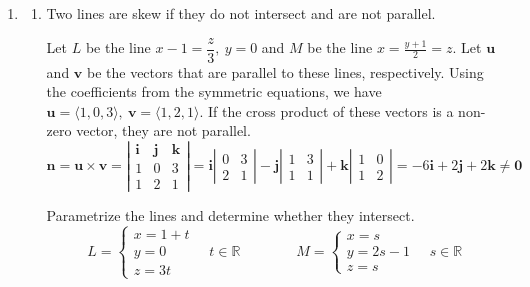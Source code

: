 \documentclass[a4paper, 12pt]{article}
\begin{document}
\newpage
{}
{}



\begin{enumerate}[leftmargin=*,label=\textbf{\arabic*.}]
\item
\begin{enumerate}[leftmargin=*,label=\textbf{\alph*.}]
\item \label{item:19_20_spring_midterm_1} Two lines are skew if they do not intersect and are not parallel.

Let $L$ be the line $x-1=\dfrac z3,\: y=0$  and $M$ be the line $\displaystyle x=\frac{y+1}2=z$. Let $\mathbf u$ and $\mathbf v$ be the vectors that are parallel to these lines, respectively. Using the coefficients from the symmetric equations, we have $\mathbf u=\langle1,0,3\rangle, \:\mathbf v= \langle1,2,1\rangle$. If the cross product of these vectors is a non-zero vector, they are not parallel.
\[\mathbf{n}=\mathbf{u}\times\mathbf{v}=\left|\begin{array}{ccc}
\mathbf{i}&\mathbf{j}&\mathbf{k}\\
1&0&3\\
1&2&1
\end{array}\right|=\mathbf{i}\left|\begin{array}{cc}
0&3\\2&1
\end{array}\right|-\mathbf{j}\left|\begin{array}{cc}
1&3\\1&1
\end{array}\right|+\mathbf{k}\left|\begin{array}{cc}
1&0\\1&2
\end{array}\right|=-6\mathbf{i}+2\mathbf{j}+2\mathbf{k}\neq\mathbf{0}\]

Parametrize the lines and determine whether they intersect.
\[L=\left\{\begin{array}{l}
x=1+t\\
y=0\\
z=3t
\end{array}\right.\quad t\in\mathbb{R}\qquad\qquad M=\left\{\begin{array}{l}
x=s\\
y=2s-1\\
z=s
\end{array}\right.\quad s\in\mathbb{R}\]


\end{enumerate}
\end{enumerate}
\end{document}
